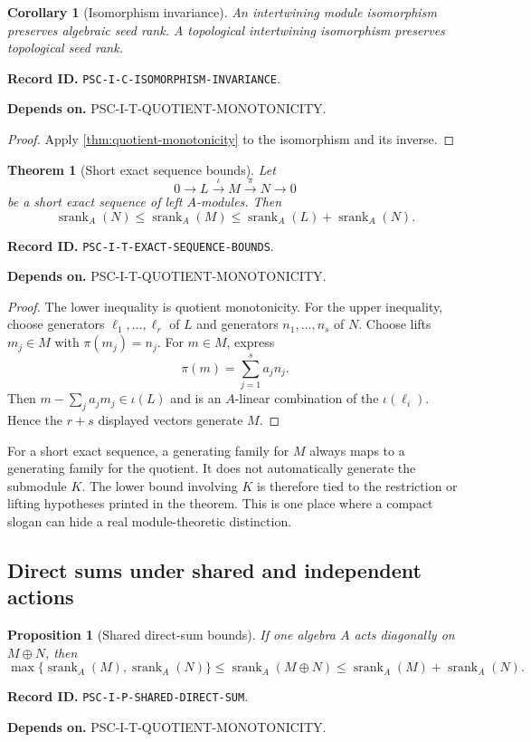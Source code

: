 \documentclass[11pt]{article}
\newtheorem{theorem}{Theorem}[section]
\newtheorem{proposition}[proposition]{Proposition}
\newtheorem{corollary}[corollary]{Corollary}
\theoremstyle{definition}
\theoremstyle{remark}
\newcommand{\srank}{\operatorname{srank}}
\newcommand{\RecordID}[1]{\par\smallskip\noindent\begingroup\footnotesize\color{PSCGray}\raggedright\textbf{Record ID.} \nolinkurl{#1}.\par\endgroup}
\newcommand{\Depends}[1]{\par\noindent\begingroup\footnotesize\color{PSCGray}\raggedright\textbf{Depends on.} #1\par\endgroup}
\begin{document}
\begin{corollary}[Isomorphism invariance]
\label{cor:isomorphism-invariance}
An intertwining module isomorphism preserves algebraic seed rank.  A topological intertwining isomorphism preserves topological seed rank.
\end{corollary}
\RecordID{PSC-I-C-ISOMORPHISM-INVARIANCE}
\Depends{PSC-I-T-QUOTIENT-MONOTONICITY.}

\begin{proof}
Apply \cref{thm:quotient-monotonicity} to the isomorphism and its inverse.
\end{proof}

\begin{theorem}[Short exact sequence bounds]
\label{thm:exact-sequence-bounds}
Let
\[
0\longrightarrow L\xrightarrow{\iota}M\xrightarrow{\pi}N\longrightarrow0
\]
be a short exact sequence of left $A$-modules.  Then
\[
\boxed{
\srank_A(N)\leq\srank_A(M)
\leq\srank_A(L)+\srank_A(N).
}
\]
\end{theorem}
\RecordID{PSC-I-T-EXACT-SEQUENCE-BOUNDS}
\Depends{PSC-I-T-QUOTIENT-MONOTONICITY.}

\begin{proof}
The lower inequality is quotient monotonicity.  For the upper inequality, choose generators $\ell_1,\ldots,\ell_r$ of $L$ and generators $n_1,\ldots,n_s$ of $N$.  Choose lifts $m_j\in M$ with $\pi(m_j)=n_j$.  For $m\in M$, express
\[
\pi(m)=\sum_{j=1}^sa_jn_j.
\]
Then $m-\sum_ja_jm_j\in\iota(L)$ and is an $A$-linear combination of the $\iota(\ell_i)$.  Hence the $r+s$ displayed vectors generate $M$.
\end{proof}

\begin{hypothesisguide}
For a short exact sequence, a generating family for \(M\) always maps to a generating family for the quotient.  It does not automatically generate the submodule \(K\).  The lower bound involving \(K\) is therefore tied to the restriction or lifting hypotheses printed in the theorem.  This is one place where a compact slogan can hide a real module-theoretic distinction.
\end{hypothesisguide}


\subsection{Direct sums under shared and independent actions}
\begin{proposition}[Shared direct-sum bounds]
\label{prop:shared-direct-sum}
If one algebra $A$ acts diagonally on $M\oplus N$, then
\[
\boxed{
\max\{\srank_A(M),\srank_A(N)\}
\leq\srank_A(M\oplus N)
\leq\srank_A(M)+\srank_A(N).
}
\]
\end{proposition}
\RecordID{PSC-I-P-SHARED-DIRECT-SUM}
\Depends{PSC-I-T-QUOTIENT-MONOTONICITY.}
\end{document}
